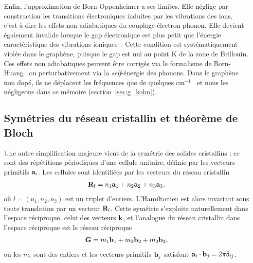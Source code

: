 Enfin, l'approximation de Born-Oppenheimer a ses limites. Elle néglige par construction les transitions électroniques induites par les vibrations des ions, c'est-à-dire les effets non adiabatiques du couplage électron-phonon. Elle devient également invalide lorsque le gap électronique est plus petit que l'énergie caractéristique des vibrations ioniques~\cite{pisanaBornOppenheimerBreakdownGraphene2007}. Cette condition est systématiquement violée dans le graphène, puisque le gap est nul au point K de la zone de Brillouin. Ces effets non adiabatiques peuvent être corrigés via le formalisme de Born-Huang~\cite{bornDynamicalTheoryCrystal1998} ou perturbativement via la \textit{self}-énergie des phonons. Dans le graphène non dopé, ils ne déplacent les fréquences que de quelques cm$^{-1}$~\cite{lazzeriNonadiabaticKohnanomalyDoped2006} et nous les négligeons dans ce mémoire (section~\ref{sec:g_kohn}).

\subsection{Symétries du réseau cristallin et théorème de Bloch}\label{sec:symétries}

Une autre simplification majeure vient de la symétrie des solides cristallins : ce sont des répétitions périodiques d'une cellule unitaire, définie par les vecteurs primitifs $\mathbf{a}_i$. Les cellules sont identifiées par les vecteurs du réseau cristallin
\begin{equation}
    \mathbf{R}_l = n_1\mathbf{a}_1+n_2\mathbf{a}_2+n_3\mathbf{a}_3,\label{eqn:c2_Rl}
\end{equation}
où $l=(n_1,n_2,n_3)$ est un triplet d'entiers. L'Hamiltonien est alors invariant sous toute translation par un vecteur $\mathbf{R}_l$. Cette symétrie s'exploite naturellement dans l'espace réciproque, celui des vecteurs $\mathbf{k}$, et l'analogue du réseau cristallin dans l'espace réciproque est le réseau réciproque
\begin{equation}
    \mathbf{G} = m_1\mathbf{b}_1+m_2\mathbf{b}_2+m_3\mathbf{b}_3,
    \label{eqn:c2_G}
\end{equation}
où les $m_i$ sont des entiers et les vecteurs primitifs $\mathbf{b}_j$ satisfont $\mathbf{a}_i\cdot\mathbf{b}_j=2\pi\delta_{ij}$.

